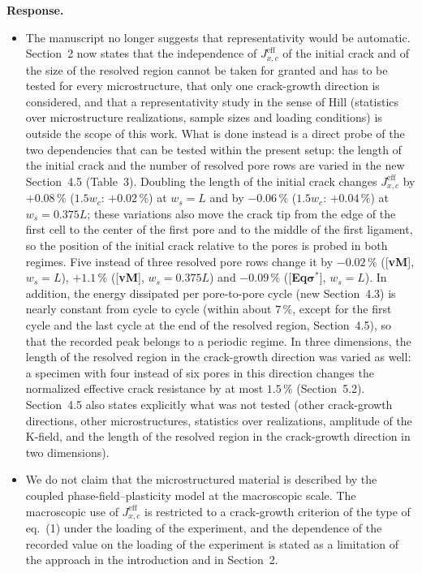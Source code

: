 \documentclass[pdflatex,sn-mathphys-num]{sn-jnl}
\newcommand{\vMLabel}{[\textbf{vM}]\xspace}
\newcommand{\EqSigmaStarLabel}{[\textbf{Eq$\boldsymbol{\sigma^*}$}]\xspace}
\newenvironment{response}
  {\par\noindent\textbf{Response.}\ }
  {\par}
\begin{document}
\begin{response}
\begin{itemize}
\item The manuscript no longer suggests that representativity would be automatic. Section~2 now states that the independence of $J_{x,c}^{\text{eff}}$ of the initial crack and of the size of the resolved region cannot be taken for granted and has to be tested for every microstructure, that only one crack-growth direction is considered, and that a representativity study in the sense of Hill (statistics over microstructure realizations, sample sizes and loading conditions) is outside the scope of this work. What is done instead is a direct probe of the two dependencies that can be tested within the present setup: the length of the initial crack and the number of resolved pore rows are varied in the new Section~4.5 (Table~3). Doubling the length of the initial crack changes $J_{x,c}^{\text{eff}}$ by $+0.08\,\%$ ($1.5w_c$: $+0.02\,\%$) at $w_s = L$ and by $-0.06\,\%$ ($1.5w_c$: $+0.04\,\%$) at $w_s = 0.375L$; these variations also move the crack tip from the edge of the first cell to the center of the first pore and to the middle of the first ligament, so the position of the initial crack relative to the pores is probed in both regimes. Five instead of three resolved pore rows change it by $-0.02\,\%$ (\vMLabel, $w_s = L$), $+1.1\,\%$ (\vMLabel, $w_s = 0.375L$) and $-0.09\,\%$ (\EqSigmaStarLabel, $w_s = L$). In addition, the energy dissipated per pore-to-pore cycle (new Section~4.3) is nearly constant from cycle to cycle (within about $7\,\%$, except for the first cycle and the last cycle at the end of the resolved region, Section~4.5), so that the recorded peak belongs to a periodic regime. In three dimensions, the length of the resolved region in the crack-growth direction was varied as well: a specimen with four instead of six pores in this direction changes the normalized effective crack resistance by at most $1.5\,\%$ (Section~5.2). Section~4.5 also states explicitly what was not tested (other crack-growth directions, other microstructures, statistics over realizations, amplitude of the K-field, and the length of the resolved region in the crack-growth direction in two dimensions).
\item We do not claim that the microstructured material is described by the coupled phase-field--plasticity model at the macroscopic scale. The macroscopic use of $J_{x,c}^{\text{eff}}$ is restricted to a crack-growth criterion of the type of eq.~(1) under the loading of the experiment, and the dependence of the recorded value on the loading of the experiment is stated as a limitation of the approach in the introduction and in Section~2.
\end{itemize}
\end{response}
\end{document}
